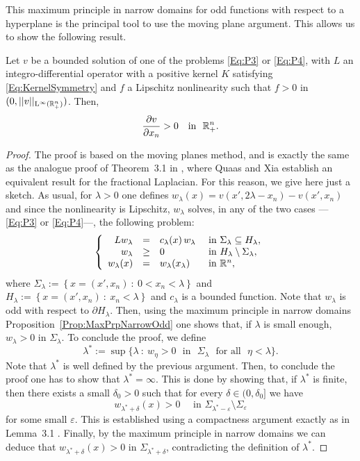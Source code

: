 This maximum principle in narrow domains for odd functions with respect to a hyperplane is the principal tool to use the moving plane argument. This allows us to show the following result.

\begin{proposition}
	\label{Prop:MonotonyHalfSpace}
	Let $v$ be a bounded solution of one of the problems \eqref{Eq:P3} or \eqref{Eq:P4}, with $L$ an integro-differential operator with a positive kernel $K$ satisfying \eqref{Eq:KernelSymmetry} and $f$ a Lipschitz nonlinearity such that $f>0$ in $(0,||v||_{\mathrm{L}^{\infty}(\mathbb{R}^n_+)})$. Then,
	$$ 
	\frac{\partial v}{\partial x_n} > 0 \,\,\,\, \text{ in } \,\,\mathbb{R}^n_+.
	$$
\end{proposition}


\begin{proof}
	The proof is based on the moving planes method, and is exactly the same as the analogue proof of Theorem~3.1 in \cite{QuaasXia}, where Quaas and Xia establish an equivalent result for the fractional Laplacian. For this reason, we give here just a sketch. As usual, for $\lambda > 0$ one defines $w_\lambda (x) = v(x',2\lambda - x_n)-v(x',x_n)$ and since the nonlinearity is Lipschitz, $w_\lambda$ solves, in any of the two cases ---\eqref{Eq:P3} or \eqref{Eq:P4}---, the following problem:
	$$
	\left\{\begin{array}{rcll} 
	L w_\lambda &=& c_\lambda(x)\,w_\lambda  &\textrm{ in } \Sigma_\lambda\subseteq H_\lambda,\\ 
	w_\lambda &\geq& 0 &\textrm{ in } H_\lambda\setminus\Sigma_\lambda,\\ 
	w_\lambda(x) &=& w_\lambda(x_\lambda) &\textrm{ in } \mathbb{R}^n, 
	\end{array} \right. 
	$$
	where $\Sigma_\lambda := \left\{ x = (x',x_n) \ : \ 0<x_n<\lambda \right\}$ and $H_\lambda := \left\{ x = (x',x_n) \ : \ x_n<\lambda \right\}$ and $c_\lambda$ is a bounded function. Note that $w_\lambda$ is odd with respect to $\partial H_\lambda$. Then, using the maximum principle in narrow domains  Proposition~\ref{Prop:MaxPrpNarrowOdd} one shows that, if $\lambda$ is small enough, $w_\lambda>0$ in $\Sigma_\lambda$. To conclude the proof, we define 
	$$ 
	\lambda^* := \sup\{\lambda \ : \ w_\eta>0 \,\, \text{ in } \,\, \Sigma_\lambda \,\, \text{ for all } \,\, \eta<\lambda\}. 
	$$
	Note that $\lambda^*$ is well defined by the previous argument. Then, to conclude the proof one has to show that $\lambda^*=\infty$. This is done by showing that, if $\lambda^*$ is finite, then there exists a small $\delta_0 > 0$ such that for every $\delta \in (0,\delta_0]$ we have
	$$
	w_{\lambda^* +  \delta} (x) > 0 \quad \text{ in } \Sigma_{\lambda^*-\varepsilon}\setminus \Sigma_{\varepsilon}
	$$
	for some small $\varepsilon$.
	This is established using a compactness argument exactly as in Lemma~3.1 \cite{QuaasXia}. Finally, by the maximum principle in narrow domains we can deduce that $w_{\lambda^* +  \delta} (x) > 0 $ in $\Sigma_{\lambda^*+\delta}$, contradicting the definition of $\lambda^*$.
\end{proof}

